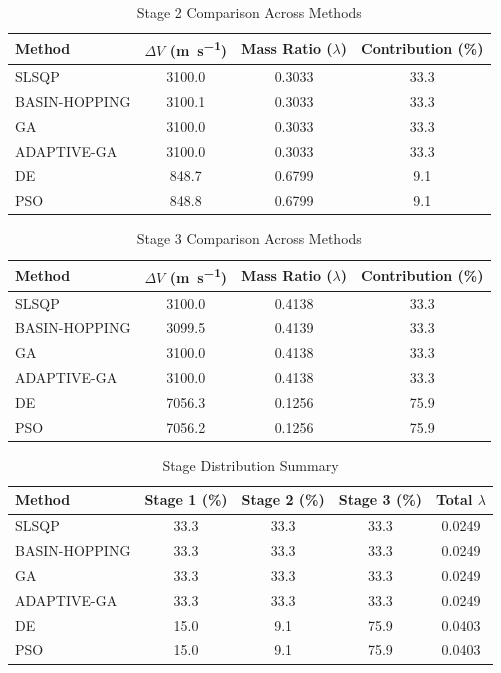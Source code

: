 \documentclass{article}
\begin{document}
\begin{table}[H]
\centering
\caption{Stage 2 Comparison Across Methods}
\begin{tabular}{lS[table-format=4.1]S[table-format=1.4]S[table-format=3.1]}
\toprule
Method & {$\Delta V$ (\si{\meter\per\second})} & {Mass Ratio ($\lambda$)} & {Contribution (\%)} \\
\midrule
SLSQP        & 3100.0 & 0.3033 & 33.3 \\
BASIN-HOPPING & 3100.1 & 0.3033 & 33.3 \\
GA           & 3100.0 & 0.3033 & 33.3 \\
ADAPTIVE-GA  & 3100.0 & 0.3033 & 33.3 \\
DE           & 848.7 & 0.6799 & 9.1 \\
PSO          & 848.8 & 0.6799 & 9.1 \\
\bottomrule
\end{tabular}
\end{table}

\begin{table}[H]
\centering
\caption{Stage 3 Comparison Across Methods}
\begin{tabular}{lS[table-format=4.1]S[table-format=1.4]S[table-format=3.1]}
\toprule
Method & {$\Delta V$ (\si{\meter\per\second})} & {Mass Ratio ($\lambda$)} & {Contribution (\%)} \\
\midrule
SLSQP        & 3100.0 & 0.4138 & 33.3 \\
BASIN-HOPPING & 3099.5 & 0.4139 & 33.3 \\
GA           & 3100.0 & 0.4138 & 33.3 \\
ADAPTIVE-GA  & 3100.0 & 0.4138 & 33.3 \\
DE           & 7056.3 & 0.1256 & 75.9 \\
PSO          & 7056.2 & 0.1256 & 75.9 \\
\bottomrule
\end{tabular}
\end{table}

\begin{table}[H]
\centering
\caption{Stage Distribution Summary}
\begin{tabular}{lS[table-format=4.1]S[table-format=4.1]S[table-format=4.1]S[table-format=1.4]}
\toprule
Method & {Stage 1 (\%)} & {Stage 2 (\%)} & {Stage 3 (\%)} & {Total $\lambda$} \\
\midrule
SLSQP        & 33.3 & 33.3 & 33.3 & 0.0249 \\
BASIN-HOPPING & 33.3 & 33.3 & 33.3 & 0.0249 \\
GA           & 33.3 & 33.3 & 33.3 & 0.0249 \\
ADAPTIVE-GA  & 33.3 & 33.3 & 33.3 & 0.0249 \\
DE           & 15.0 & 9.1 & 75.9 & 0.0403 \\
PSO          & 15.0 & 9.1 & 75.9 & 0.0403 \\
\bottomrule
\end{tabular}
\end{table}
\end{document}
